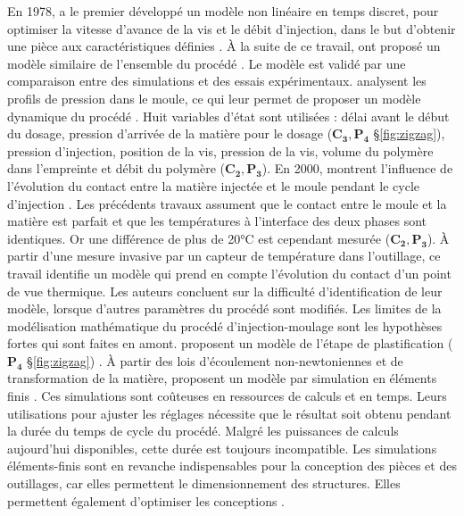 En 1978, \citeauthor{shankar_dynamic_1978} a le premier développé un modèle non linéaire en temps discret, pour optimiser la vitesse d'avance de la vis et le débit d'injection, dans le but d’obtenir une pièce aux caractéristiques définies \cite{shankar_dynamic_1978}.
À la suite de ce travail, \citeauthor{shankar_mathematical_1982} ont proposé un modèle similaire de l'ensemble du procédé \cite{shankar_mathematical_1982}.
Le modèle est validé par une comparaison entre des simulations et des essais expérimentaux.
\citeauthor{chiu_dynamic_1991} analysent les profils de pression dans le moule, ce qui leur permet de proposer un modèle dynamique du procédé \cite{chiu_dynamic_1991}.
Huit variables d’état sont utilisées : délai avant le début du dosage, pression d’arrivée de la matière pour le dosage ($\boldsymbol{C_3, P_4}$ §\ref{fig:zigzag}), pression d’injection, position de la vis, pression de la vis, volume du polymère dans l’empreinte et débit du polymère ($\boldsymbol{C_2, P_3}$).
En 2000, \citeauthor{delaunay_nature_2000} montrent l'influence de l'évolution du contact entre la matière injectée et le moule pendant le cycle d'injection \cite{delaunay_nature_2000}.
Les précédents travaux assument que le contact entre le moule et la matière est parfait et que les températures à l'interface des deux phases sont identiques.
Or une différence de plus de 20°C est cependant mesurée ($\boldsymbol{C_2, P_3}$).
À partir d'une mesure invasive par un capteur de température dans l'outillage, ce travail identifie un modèle qui prend en compte l'évolution du contact d'un point de vue thermique.
Les auteurs concluent sur la difficulté d'identification de leur modèle, lorsque d'autres paramètres du procédé sont modifiés.
Les limites de la modélisation mathématique du procédé d'injection-moulage sont les hypothèses fortes qui sont faites en amont.
\citeauthor{bereaux_series_2004} proposent un modèle de l'étape de plastification ($\boldsymbol{P_4}$ §\ref{fig:zigzag}) \cite{bereaux_series_2004}.
À partir des lois d'écoulement non-newtoniennes et de transformation de la matière, \citeauthor{moguedet_use_2009} proposent un modèle par simulation en éléments finis \cite{moguedet_use_2009}.
Ces simulations sont coûteuses en ressources de calculs et en temps.
Leurs utilisations pour ajuster les réglages nécessite que le résultat soit obtenu pendant la durée du temps de cycle du procédé.
Malgré les puissances de calculs aujourd’hui disponibles, cette durée
est toujours incompatible.
Les simulations éléments-finis sont en revanche indispensables pour la conception des pièces et des outillages, car elles permettent le dimensionnement des structures.
Elles permettent également d’optimiser les conceptions \cite{gao_adaptive_2008}.


